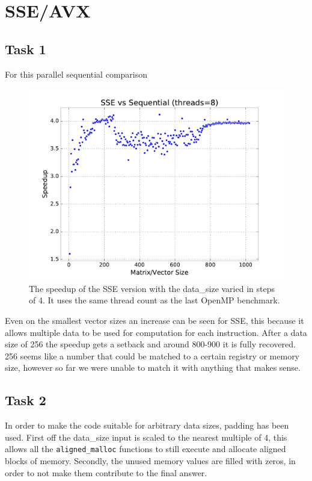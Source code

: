 \documentclass[final]{report}
\begin{document}
\chapter{SSE/AVX}

\section{Task 1}
For this parallel sequential comparison 
\begin{figure}[H]
\centering
    \includegraphics[width=\linewidth]{resources/sse-data-size-sweep.pdf}
    \caption{The speedup of the SSE version with the data\_size varied in steps of 4. It uses the same thread count as the last OpenMP benchmark.}
    \label{fig:sse-data-size-sweep}
\end{figure}

Even on the smallest vector sizes an increase can be seen for SSE, this because it allows multiple data to be used for computation for each instruction.
After a data size of 256 the speedup gets a setback and around 800-900 it is fully recovered.
256 seems like a number that could be matched to a certain registry or memory size, however so far we were unable to match it with anything that makes sense.


\section{Task 2}
In order to make the code suitable for arbitrary data sizes, padding has been used.
First off the data\_size input is scaled to the nearest multiple of 4, this allows all the \texttt{aligned\_malloc} functions to still execute and allocate aligned blocks of memory.
Secondly, the unused memory values are filled with zeros, in order to not make them contribute to the final answer.
\end{document}
